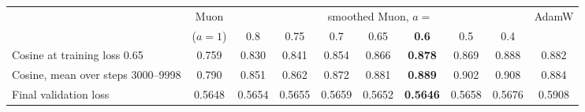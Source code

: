 \begin{tabular}{@{}l|c|ccccccc|c@{}}
 & Muon & \multicolumn{7}{c|}{smoothed Muon, $a=$} & AdamW \\
 & ($a=1$) & 0.8 & 0.75 & 0.7 & 0.65 & \textbf{0.6} & 0.5 & 0.4 & \\
\hline
Cosine at training loss 0.65 & 0.759 & 0.830 & 0.841 & 0.854 & 0.866 & \textbf{0.878} & 0.869 & 0.888 & 0.882 \\
Cosine, mean over steps 3000--9998 & 0.790 & 0.851 & 0.862 & 0.872 & 0.881 & \textbf{0.889} & 0.902 & 0.908 & 0.884 \\
Final validation loss & 0.5648 & 0.5654 & 0.5655 & 0.5659 & 0.5652 & \textbf{0.5646} & 0.5658 & 0.5676 & 0.5908 \\
\hline
\end{tabular}
